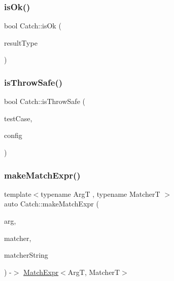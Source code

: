 \subsubsection{\texorpdfstring{is\+Ok()}{isOk()}}
{\footnotesize\ttfamily bool Catch\+::is\+Ok (\begin{DoxyParamCaption}\item[{\mbox{\hyperlink{struct_catch_1_1_result_was_a624e1ee3661fcf6094ceef1f654601ef}{Result\+Was\+::\+Of\+Type}}}]{result\+Type }\end{DoxyParamCaption})}

\mbox{\label{namespace_catch_af3e820574c7a0b38d71328c5bd54b0e0}} 
\subsubsection{\texorpdfstring{is\+Throw\+Safe()}{isThrowSafe()}}
{\footnotesize\ttfamily bool Catch\+::is\+Throw\+Safe (\begin{DoxyParamCaption}\item[{\mbox{\hyperlink{class_catch_1_1_test_case}{Test\+Case}} const \&}]{test\+Case,  }\item[{\mbox{\hyperlink{struct_catch_1_1_i_config}{I\+Config}} const \&}]{config }\end{DoxyParamCaption})}

\mbox{\label{namespace_catch_a23a9a9a6dfef7ecd5e0eaf553fc52de6}} 
\subsubsection{\texorpdfstring{make\+Match\+Expr()}{makeMatchExpr()}}
{\footnotesize\ttfamily template$<$typename ArgT , typename MatcherT $>$ \\
auto Catch\+::make\+Match\+Expr (\begin{DoxyParamCaption}\item[{ArgT const \&}]{arg,  }\item[{MatcherT const \&}]{matcher,  }\item[{\mbox{\hyperlink{class_catch_1_1_string_ref}{String\+Ref}} const \&}]{matcher\+String }\end{DoxyParamCaption}) -\/$>$ \mbox{\hyperlink{class_catch_1_1_match_expr}{Match\+Expr}}$<$ArgT, MatcherT$>$ }

